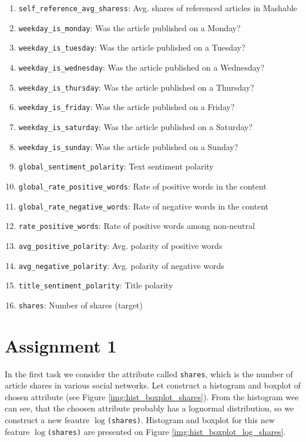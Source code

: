 \begin{enumerate}
\item \texttt{self\_reference\_avg\_sharess}: Avg. shares of referenced articles in Mashable  
\item \texttt{weekday\_is\_monday}: Was the article published on a Monday?
\item \texttt{weekday\_is\_tuesday}: Was the article published on a Tuesday? 
\item \texttt{weekday\_is\_wednesday}: Was the article published on a Wednesday?
\item \texttt{weekday\_is\_thursday}: Was the article published on a Thursday? 
\item \texttt{weekday\_is\_friday}: Was the article published on a Friday?
\item \texttt{weekday\_is\_saturday}: Was the article published on a Saturday? 
\item \texttt{weekday\_is\_sunday}: Was the article published on a Sunday?
\item \texttt{global\_sentiment\_polarity}:     Text sentiment polarity
\item \texttt{global\_rate\_positive\_words}:    Rate of positive words in the content
\item \texttt{global\_rate\_negative\_words}:    Rate of negative words in the content
\item \texttt{rate\_positive\_words}:           Rate of positive words among non-neutral
\item \texttt{avg\_positive\_polarity}:         Avg. polarity of positive words
\item \texttt{avg\_negative\_polarity}:         Avg. polarity of negative  words 
\item \texttt{title\_sentiment\_polarity}:      Title polarity
\item \texttt{shares}:                        Number of shares (target)
\end{enumerate} 

\section{Assignment 1}
In the first task we consider the attribute called \texttt{shares},  which is the number of article shares in various social networks. Let construct a histogram and boxplot of chosen attribute (see Figure \ref{img:hist_boxplot_shares}). From the histogram wee can see, that the choosen attribute probably has a lognormal distribution, so we construct a new feautre \texttt{$\log$(shares)}. Histogram and boxplot for this new feature \texttt{$\log$(shares)} are presented on  Figure \ref{img:hist_boxplot_log_shares}. 


